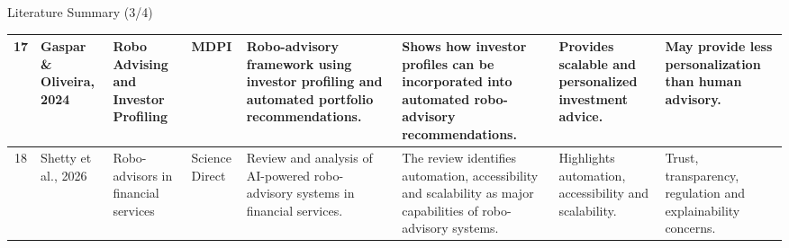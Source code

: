 \documentclass{beamer}
\begin{document}
\begin{frame}{Literature Summary (3/4)}
{\begin{tabular}{c p{1.8cm} p{2.5cm} p{1.5cm} p{2.8cm} p{2.8cm} p{2.5cm} p{2.5cm}}
\midrule

17 &
Gaspar \& Oliveira, 2024 &
Robo Advising and Investor Profiling &
MDPI &
Robo-advisory framework using investor profiling and automated portfolio recommendations. &
Shows how investor profiles can be incorporated into automated robo-advisory recommendations. &
Provides scalable and personalized investment advice. &
May provide less personalization than human advisory. \\

\midrule

18 &
Shetty et al., 2026 &
Robo-advisors in financial services &
Science Direct &
Review and analysis of AI-powered robo-advisory systems in financial services. &
The review identifies automation, accessibility and scalability as major capabilities of robo-advisory systems. &
Highlights automation, accessibility and scalability. &
Trust, transparency, regulation and explainability concerns. \\

\bottomrule
\end{tabular}%
}

\end{frame}
\end{document}
